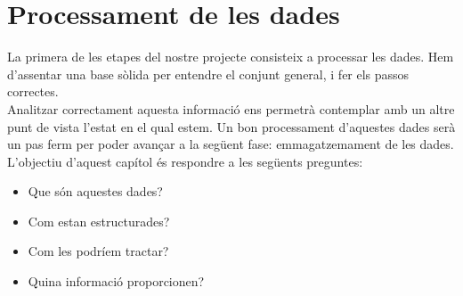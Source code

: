 \chapter{Processament de les dades}\label{ch:log-processing}

La primera de les etapes del nostre projecte consisteix a processar les dades.
Hem d'assentar una base sòlida per entendre el conjunt general, i fer els passos correctes. \\

\noindent
Analitzar correctament aquesta informació ens permetrà contemplar amb un altre punt de vista l'estat en el qual estem.
Un bon processament d'aquestes dades serà un pas ferm per poder avançar a la següent fase: emmagatzemament de les dades. \\

\noindent
L'objectiu d'aquest capítol és respondre a les següents preguntes:

\begin{itemize}
    \item Que són aquestes dades?
    \item Com estan estructurades?
    \item Com les podríem tractar?
    \item Quina informació proporcionen?
\end{itemize}


\clearpage

